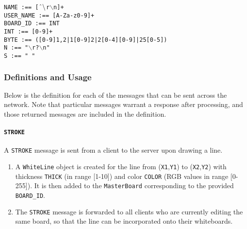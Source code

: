 \texttt{NAME :== [$\char`\^ \backslash$r$\backslash$n]+}\\
\texttt{USER\_NAME :== [A-Za-z0-9]+}\\
\texttt{BOARD\_ID :== INT}\\

\texttt{INT :== [0-9]+}\\
\texttt{BYTE :== ([0-9]{1,2}|1[0-9]{2}|2[0-4][0-9]|25[0-5])}\\ %
\texttt{N :== "$\backslash$r?$\backslash$n"}\\
\texttt{S :== " "}\\

\setlength{\parindent}{15pt} %

\subsubsection{Definitions and Usage}
Below is the definition for each of the messages that can be sent across the network. Note that particular messages warrant a response after processing, and those returned messages are included in the definition.

\paragraph{\texttt{STROKE}} A \texttt{STROKE} message is sent from a client to the server upon drawing a line.
\begin{enumerate}
\item A \texttt{WhiteLine} object is created for the line from (\texttt{X1},\texttt{Y1}) to (\texttt{X2},\texttt{Y2}) with thickness \texttt{THICK} (in range [1-10]) and color \texttt{COLOR} (RGB values in range [0-255]). It is then added to the \texttt{MasterBoard} corresponding to the provided \texttt{BOARD\_ID}.
\item The \texttt{STROKE} message is forwarded to all clients who are currently editing the same board, so that the line can be incorporated onto their whiteboards.
\end{enumerate}

